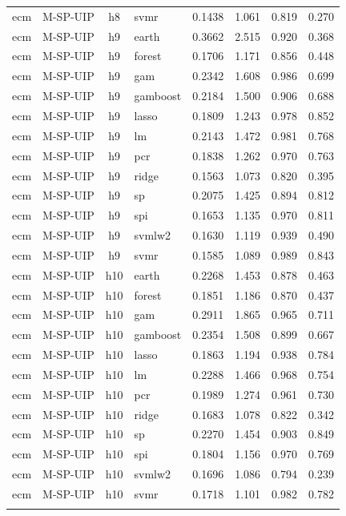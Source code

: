 \begin{ThreePartTable}
\begin{longtable}[t]{llclcccc}
ecm & M-SP-UIP & h8 & svmr & 0.1438 & 1.061 & 0.819 & 0.270\\
\addlinespace
ecm & M-SP-UIP & h9 & earth & 0.3662 & 2.515 & 0.920 & 0.368\\
ecm & M-SP-UIP & h9 & forest & 0.1706 & 1.171 & 0.856 & 0.448\\
ecm & M-SP-UIP & h9 & gam & 0.2342 & 1.608 & 0.986 & 0.699\\
ecm & M-SP-UIP & h9 & gamboost & 0.2184 & 1.500 & 0.906 & 0.688\\
ecm & M-SP-UIP & h9 & lasso & 0.1809 & 1.243 & 0.978 & 0.852\\
ecm & M-SP-UIP & h9 & lm & 0.2143 & 1.472 & 0.981 & 0.768\\
ecm & M-SP-UIP & h9 & pcr & 0.1838 & 1.262 & 0.970 & 0.763\\
ecm & M-SP-UIP & h9 & ridge & 0.1563 & 1.073 & 0.820 & 0.395\\
ecm & M-SP-UIP & h9 & sp & 0.2075 & 1.425 & 0.894 & 0.812\\
ecm & M-SP-UIP & h9 & spi & 0.1653 & 1.135 & 0.970 & 0.811\\
ecm & M-SP-UIP & h9 & svmlw2 & 0.1630 & 1.119 & 0.939 & 0.490\\
ecm & M-SP-UIP & h9 & svmr & 0.1585 & 1.089 & 0.989 & 0.843\\
\addlinespace
ecm & M-SP-UIP & h10 & earth & 0.2268 & 1.453 & 0.878 & 0.463\\
ecm & M-SP-UIP & h10 & forest & 0.1851 & 1.186 & 0.870 & 0.437\\
ecm & M-SP-UIP & h10 & gam & 0.2911 & 1.865 & 0.965 & 0.711\\
ecm & M-SP-UIP & h10 & gamboost & 0.2354 & 1.508 & 0.899 & 0.667\\
ecm & M-SP-UIP & h10 & lasso & 0.1863 & 1.194 & 0.938 & 0.784\\
ecm & M-SP-UIP & h10 & lm & 0.2288 & 1.466 & 0.968 & 0.754\\
ecm & M-SP-UIP & h10 & pcr & 0.1989 & 1.274 & 0.961 & 0.730\\
ecm & M-SP-UIP & h10 & ridge & 0.1683 & 1.078 & 0.822 & 0.342\\
ecm & M-SP-UIP & h10 & sp & 0.2270 & 1.454 & 0.903 & 0.849\\
ecm & M-SP-UIP & h10 & spi & 0.1804 & 1.156 & 0.970 & 0.769\\
ecm & M-SP-UIP & h10 & svmlw2 & 0.1696 & 1.086 & 0.794 & 0.239\\
ecm & M-SP-UIP & h10 & svmr & 0.1718 & 1.101 & 0.982 & 0.782\\
\addlinespace

\end{longtable}
\end{ThreePartTable}
